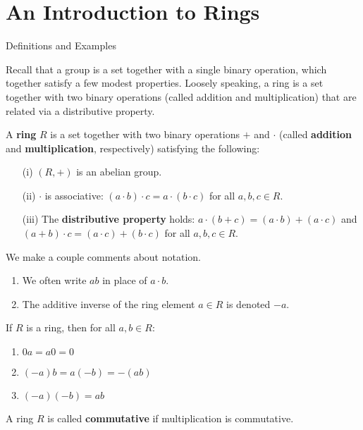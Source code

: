 \chapter{An Introduction to Rings}
\label{chapter:rings}

\begin{section}{Definitions and Examples}

Recall that a group is a set together with a single binary operation, which together satisfy a few modest properties. Loosely speaking, a ring is a set together with two binary operations (called addition and multiplication) that are related via a distributive property.

\begin{definition}
A \textbf{ring} $R$ is a set together with two binary operations $+$ and $\cdot$ (called \textbf{addition} and \textbf{multiplication}, respectively) satisfying the following:
\begin{enumerate}
\item[(i)] $(R,+)$ is an abelian group.
\item[(ii)] $\cdot$ is associative: $(a\cdot b)\cdot c=a\cdot (b\cdot c)$ for all $a,b,c\in R$.
\item[(iii)] The \textbf{distributive property} holds: $a\cdot (b+c)=(a\cdot b)+(a\cdot c)$ and $(a+b)\cdot c = (a\cdot c)+(b\cdot c)$ for all $a,b,c\in R$.
\end{enumerate}
\end{definition}

\begin{remark}
We make a couple comments about notation.
\begin{enumerate}[label=\rm{(\alph*)}]
\item We often write $ab$ in place of $a\cdot b$.
\item The additive inverse of the ring element $a\in R$ is denoted $-a$.
\end{enumerate}
\end{remark}

\begin{theorem}
If $R$ is a ring, then for all $a,b\in R$:
\begin{enumerate}[label=\rm{(\alph*)}]
\item $0a=a0=0$
\item $(-a)b=a(-b)=-(ab)$
\item $(-a)(-b)=ab$
\end{enumerate}
\end{theorem}

\begin{definition}
A ring $R$ is called \textbf{commutative} if multiplication is commutative.
\end{definition}


\end{section}
